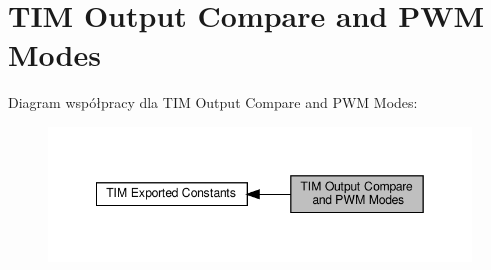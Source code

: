 \hypertarget{group___t_i_m___output___compare__and___p_w_m__modes}{}\section{T\+IM Output Compare and P\+WM Modes}
\label{group___t_i_m___output___compare__and___p_w_m__modes}
Diagram współpracy dla T\+IM Output Compare and P\+WM Modes\+:\nopagebreak
\begin{figure}[H]
\begin{center}
\leavevmode
\includegraphics[width=349pt]{group___t_i_m___output___compare__and___p_w_m__modes}
\end{center}
\end{figure}
